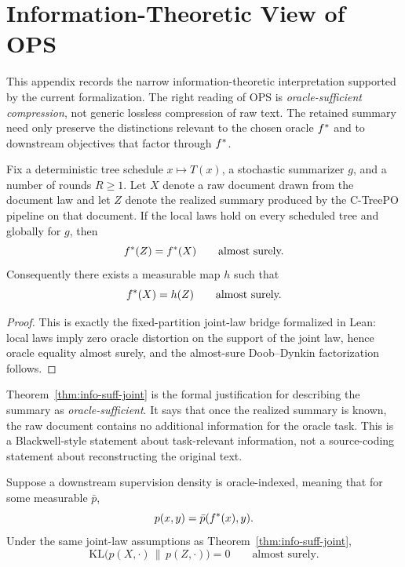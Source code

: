 \section{Information-Theoretic View of OPS}\label{sec:info-sieve}

This appendix records the narrow information-theoretic interpretation supported
by the current formalization. The right reading of OPS is \emph{oracle-sufficient
compression}, not generic lossless compression of raw text. The retained summary
need only preserve the distinctions relevant to the chosen oracle $f^{\ast}$ and
to downstream objectives that factor through $f^{\ast}$.

\begin{theorem}\label{thm:info-suff-joint}
Fix a deterministic tree schedule $x \mapsto T(x)$, a stochastic summarizer $g$,
and a number of rounds $R \ge 1$. Let $X$ denote a raw document drawn from the
document law and let $Z$ denote the realized summary produced by the C-TreePO
pipeline on that document. If the local laws hold on every scheduled tree and
globally for $g$, then
\[
f^{\ast}(Z) = f^{\ast}(X) \qquad \text{almost surely.}
\]
Consequently there exists a measurable map $h$ such that
\[
f^{\ast}(X) = h(Z) \qquad \text{almost surely.}
\]
\end{theorem}

\begin{proof}
This is exactly the fixed-partition joint-law bridge formalized in Lean: local
laws imply zero oracle distortion on the support of the joint law, hence oracle
equality almost surely, and the almost-sure Doob--Dynkin factorization follows.
\end{proof}

Theorem~\ref{thm:info-suff-joint} is the formal justification for describing the
summary as \emph{oracle-sufficient}. It says that once the realized summary is
known, the raw document contains no additional information for the oracle task.
This is a Blackwell-style statement about task-relevant information, not a
source-coding statement about reconstructing the original text.

\begin{corollary}\label{cor:info-klic}
Suppose a downstream supervision density is oracle-indexed, meaning that for
some measurable $\bar p$,
\[
p(x,y) = \bar p(f^{\ast}(x), y).
\]
Under the same joint-law assumptions as Theorem~\ref{thm:info-suff-joint},
\[
\mathrm{KL}\!\bigl(p(X,\cdot)\,\|\,p(Z,\cdot)\bigr) = 0
\qquad \text{almost surely.}
\]
\end{corollary}


